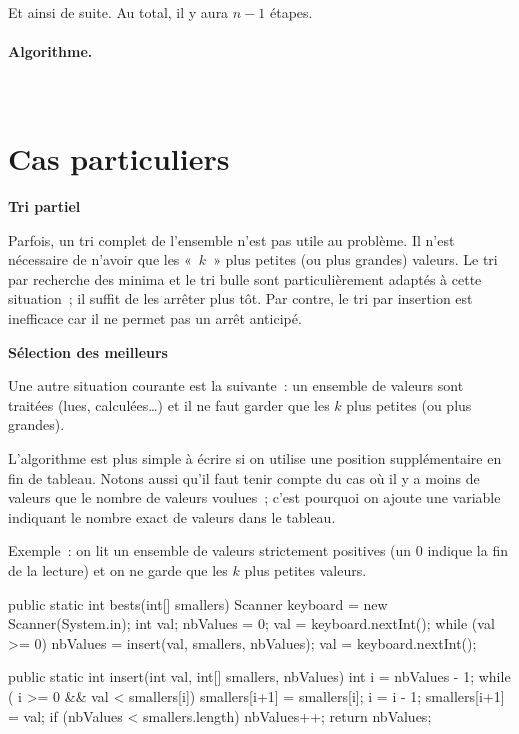 	\medskip
	Et ainsi de suite.
	Au total, il y aura $n-1$ étapes.

	\clearpage
	\paragraph{Algorithme.}~

	

\section{Cas particuliers}

	{\sffamily\bfseries\upshape
	Tri partiel}

		Parfois, un tri complet de l’ensemble n'est pas utile au problème. Il
		n'est nécessaire de n'avoir que les «~$k$~» plus petites (ou plus grandes)
		valeurs. Le tri par recherche des minima et le tri bulle sont
		particulièrement adaptés à cette situation~; il suffit de les arrêter
		plus tôt. Par contre, le tri par insertion est inefficace car il ne
		permet pas un arrêt anticipé.

	{\sffamily\bfseries\upshape
	Sélection des meilleurs}

		Une autre situation courante est la suivante~: un ensemble de valeurs
		sont traitées (lues, calculées\dots) et il ne faut garder que les
		$k$ plus petites (ou plus grandes).
		
		L’algorithme est plus simple à écrire si on utilise
		une position supplémentaire en fin de tableau. Notons aussi qu’il faut
		tenir compte du cas où il y a moins de valeurs que le nombre de valeurs
		voulues~; c’est pourquoi on ajoute une variable indiquant le nombre
		exact de valeurs dans le tableau.

		Exemple~:
		on lit un ensemble de valeurs strictement positives (un 0 indique la fin
		de la lecture) et on ne garde que les $k$ plus petites valeurs.

		\begin{java}
public static int bests(int[] smallers){
	Scanner keyboard = new Scanner(System.in);
	int val;
	nbValues = 0;
	val = keyboard.nextInt();
	while (val >= 0){
		nbValues = insert(val, smallers, nbValues);
		val = keyboard.nextInt();
	}
}

public static int insert(int val, int[] smallers, nbValues){
	int i = nbValues - 1;
	while ( i >= 0 && val < smallers[i]){
		smallers[i+1] = smallers[i];
		i = i - 1;
	}
	smallers[i+1] = val;
	if (nbValues < smallers.length){
		nbValues++;
	}
	return nbValues;
}
		\end{java}

